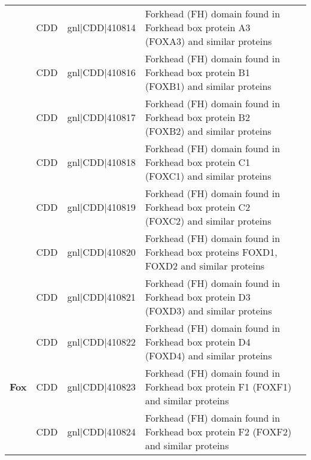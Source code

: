 \documentclass[../main.tex]{subfiles}
\begin{document}
\begin{landscape}
\begin{longtable}{@{}cllll@{}}
		                                & CDD                  & gnl|CDD|410814  & Forkhead (FH) domain found in Forkhead box protein A3 (FOXA3) and similar proteins                                                           & \\
		                                & CDD                  & gnl|CDD|410816  & Forkhead (FH) domain found in Forkhead box protein B1 (FOXB1) and similar proteins                                                           & \\
		                                & CDD                  & gnl|CDD|410817  & Forkhead (FH) domain found in Forkhead box protein B2 (FOXB2) and similar proteins                                                           & \\
		                                & CDD                  & gnl|CDD|410818  & Forkhead (FH) domain found in Forkhead box protein C1 (FOXC1) and similar proteins                                                           & \\
		                                & CDD                  & gnl|CDD|410819  & Forkhead (FH) domain found in Forkhead box protein C2 (FOXC2) and similar proteins                                                           & \\
		                                & CDD                  & gnl|CDD|410820  & Forkhead (FH) domain found in Forkhead box proteins FOXD1, FOXD2 and similar proteins                                                        & \\
		                                & CDD                  & gnl|CDD|410821  & Forkhead (FH) domain found in Forkhead box protein D3 (FOXD3) and similar proteins                                                           & \\
		\multirow{43}{*}{\textbf{Fox}}  & CDD                  & gnl|CDD|410822  & Forkhead (FH) domain found in Forkhead box protein D4 (FOXD4) and similar proteins                                                           & \\
		                                & CDD                  & gnl|CDD|410823  & Forkhead (FH) domain found in Forkhead box protein F1 (FOXF1) and similar proteins                                                           & \\
		                                & CDD                  & gnl|CDD|410824  & Forkhead (FH) domain found in Forkhead box protein F2 (FOXF2) and similar proteins                                                           & \\

\end{longtable}
\end{landscape}
\end{document}

